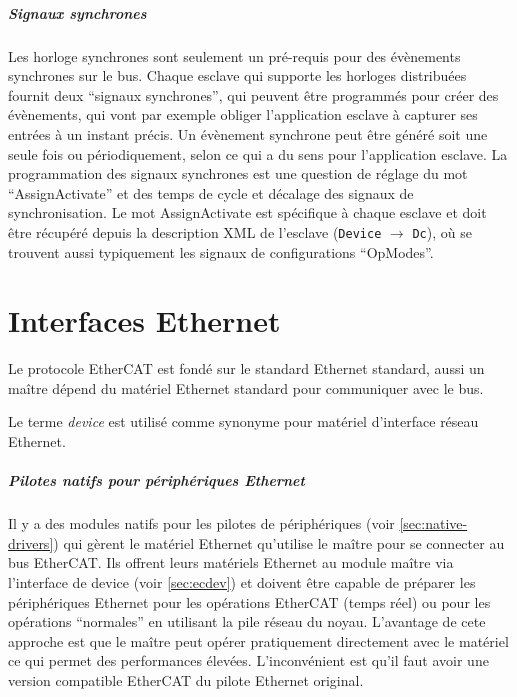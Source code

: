 \documentclass[a4paper,12pt,BCOR=6mm,bibtotoc,idxtotoc]{scrbook}
\begin{document}
\paragraph{Signaux synchrones} Les horloge synchrones
sont seulement un pr\'e-requis pour des \'ev\`enements synchrones sur
le bus.  Chaque esclave qui supporte les horloges distribu\'ees
fournit deux ``signaux synchrones'', qui peuvent \^etre programm\'es
pour cr\'eer des \'ev\`enements, qui vont par exemple obliger
l'application esclave \`a capturer ses entr\'ees \`a un instant
pr\'ecis.  Un \'ev\`enement synchrone peut \^etre g\'en\'er\'e soit
une seule fois ou p\'eriodiquement, selon ce qui a du sens pour
l'application esclave.  La programmation des signaux synchrones est
une question de r\'eglage du mot ``AssignActivate'' et des temps
de cycle et d\'ecalage des signaux de synchronisation. Le mot
AssignActivate est sp\'ecifique \`a chaque esclave et doit \^etre
r\'ecup\'er\'e depuis la description XML de l'esclave
(\lstinline+Device+ $\rightarrow$ \lstinline+Dc+), o\`u se trouvent
aussi typiquement les signaux de configurations ``OpModes''.


\chapter{Interfaces Ethernet}
\label{sec:devices}

Le protocole EtherCAT est fond\'e sur le standard Ethernet standard,
aussi un ma\^itre d\'epend du mat\'eriel Ethernet standard pour communiquer
avec le bus.

Le terme \textit{device} est utilis\'e comme synonyme pour mat\'eriel
d'interface r\'eseau Ethernet.

\paragraph{Pilotes natifs pour p\'eriph\'eriques Ethernet}
Il y a des modules natifs pour les pilotes de p\'eriph\'eriques (voir
\autoref{sec:native-drivers}) qui g\`erent le mat\'eriel Ethernet
qu'utilise le ma\^itre pour se connecter au bus EtherCAT. Ils offrent
leurs mat\'eriels Ethernet au module ma\^itre via l'interface de
device (voir \autoref{sec:ecdev}) et doivent \^etre capable de
pr\'eparer les p\'eriph\'eriques Ethernet pour les op\'erations
EtherCAT (temps r\'eel) ou pour les op\'erations ``normales'' en
utilisant la pile r\'eseau du noyau. L'avantage de cete approche est
que le ma\^itre peut op\'erer pratiquement directement avec le
mat\'eriel ce qui permet des performances
\'elev\'ees. L'inconv\'enient est qu'il faut avoir une version
compatible EtherCAT du pilote Ethernet original.
\end{document}
